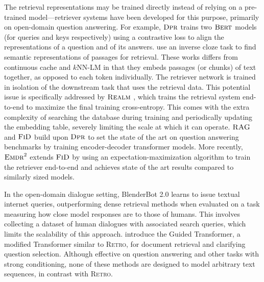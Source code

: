 The retrieval representations may be trained directly instead of relying on a pre-trained model---retriever systems have been developed for this purpose, primarily on open-domain question answering. For example, $\textsc{Dpr}$ \citep{karpukhin2020dense} trains two $\textsc{Bert}$ models (for queries and keys respectively) using a contrastive loss to align the representations of a question and of its answers. \cite{lee_latent_2019} use an inverse cloze task to find semantic representations of passages for retrieval. These works differs from continuous cache and $k\textrm{NN-LM}$ in that they embeds passages (or chunks) of text together, as opposed to each token individually. The retriever network is trained in isolation of the downstream task that uses the retrieval data. This potential issue is specifically addressed by $\textsc{Realm}$ \citep{guu2020retrieval}, which trains the retrieval system end-to-end to maximize the final training cross-entropy. This comes with the extra complexity of searching the database during training and periodically updating the embedding table, severely limiting the scale at which it can operate.
$\textsc{RAG}$ \citep{lewis2020retrieval} and $\textsc{FiD}$ \citep{izacard2020leveraging} build upon $\textsc{Dpr}$ to set the state of the art on question answering benchmarks by training encoder-decoder transformer models. More recently, $\textsc{Emdr}^2$ \citep{emdr} extends $\textsc{FiD}$ by using an expectation-maximization algorithm to train the retriever end-to-end and achieves state of the art results compared to similarly sized models.

In the open-domain dialogue setting, BlenderBot 2.0 \citep{komeili2021internet} learns to issue textual internet queries, outperforming dense retrieval methods when evaluated on a task measuring how close model responses are to those of humans. This involves collecting a dataset of human dialogues with associated search queries, which limits the scalability of this approach.
\citet{hashemi2020guided} introduce the Guided Transformer, a modified Transformer similar to \textsc{Retro}, for document retrieval and clarifying question selection. Although effective on question answering and other tasks with strong conditioning, none of these methods are designed to model arbitrary text sequences, in contrast with \textsc{Retro}.

